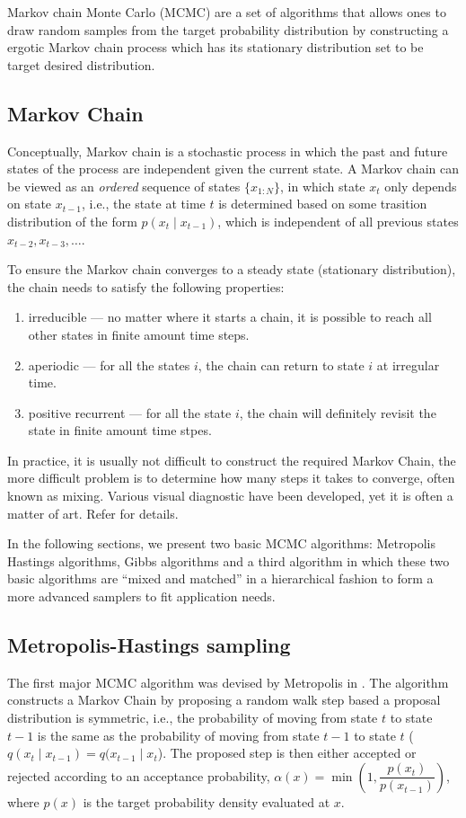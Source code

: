 Markov chain Monte Carlo (MCMC) are a set of algorithms that allows ones to draw random samples from the target probability distribution by constructing a ergotic Markov chain process which has its stationary distribution set to be target desired distribution. 

\subsection{Markov Chain}
Conceptually, Markov chain is a stochastic process in which the past and future states of the process are independent given the current state. A Markov chain can be viewed as an \emph{ordered} sequence of states $\{x_{1:N}\}$, in which state $x_t$ only depends on state $x_{t-1}$, i.e., the state at time $t$ is determined based on some trasition distribution of the form $p(x_t \mid x_{t-1})$, which is independent of all previous states $x_{t-2}, x_{t-3}, \ldots$. 

To ensure the Markov chain converges to a steady state (stationary distribution), the chain needs to satisfy the following properties:
\begin{enumerate}
\item irreducible --- no matter where it starts a chain, it is possible to reach all other states in finite amount time steps.
\item aperiodic --- 	for all the states $i$, the chain can  return to state $i$ at irregular time.
\item positive recurrent --- for all the state $i$, the chain will definitely revisit the state in finite amount time stpes.
\end{enumerate}

In practice, it is usually not difficult to construct the required Markov Chain, the more difficult problem is to determine how many steps it takes to converge, often known as mixing. Various visual diagnostic have been developed, yet it is often a matter of art. Refer \cite{RCP05} for details.

In the following sections, we present two basic MCMC algorithms: Metropolis Hastings algorithms, Gibbs algorithms and a third algorithm in which these two basic algorithms are ``mixed and matched'' in a hierarchical fashion to form a more advanced samplers to fit application needs.

\subsection{Metropolis-Hastings sampling}
The first major MCMC algorithm was devised by Metropolis in \cite{MN53}. The algorithm constructs a Markov Chain by proposing a random walk step based a proposal distribution is symmetric, i.e., the probability of moving from state $t$ to state $t-1$ is the same as the probability of moving from state $t-1$ to state $t$ ($q(x_{t} \mid x_{t-1}) = q(x_{t-1} \mid x_{t}$). The proposed step is then either accepted or rejected according to an acceptance probability, $\alpha(x)= \min\left(1, \dfrac{p(x_t)}{p(x_{t-1})}\right)$, where $p(x)$ is the target probability density evaluated at $x$.

